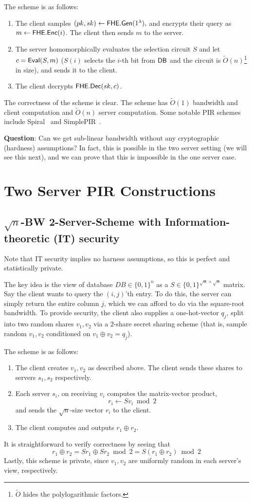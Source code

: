 The scheme is as follows:
\begin{enumerate}
	\item The client samples $(pk,sk) \leftarrow {\sf FHE}.{\sf Gen}(1^\lambda),$ and encrypts their query as $m \leftarrow {\sf FHE}.{\sf Enc}(i)$. The client then sends $m$ to the server.
	\item The server homomorphically evaluates the selection circuit $S$ and let ${c} = {\sf Eval}(S, m)$ ($S(i)$ selects the $i$-th bit from ${\sf DB}$ and the circuit is $\tilde{O}(n)$\footnote{$\tilde{O}$ hides the polylogarithmic factors.} in size), and sends it to the client. 
	\item The client decrypts ${\sf FHE}.{\sf Dec}(sk,c)$.
\end{enumerate}
The correctness of the scheme is clear. The scheme  has $\tilde{O}(1)$ bandwidth and client computation and $\tilde{O}(n)$ server computation. Some notable PIR schemes include Spiral~\cite{spiral} and SimplePIR~\cite{simplepir}.

\textbf{Question}: Can we get sub-linear bandwidth without any cryptographic (hardness) assumptions? In fact, this is possible in the two server setting (we will see this next), and we can prove that this is impossible in the one server case.

\section{Two Server PIR Constructions}
\subsection{$\sqrt{n}$-BW 2-Server-Scheme with Information-theoretic (IT) security}
Note that IT security implies no harness assumptions, so this is perfect and statistically private.

The key idea is the view of database $DB \in \{0,1\}^n$ as a $S \in \{0,1\}^{\sqrt{n} \times \sqrt{n}}$ matrix. Say the client wants to query the $(i,j)$'th entry. To do this, the server can simply return the entire column $j$, which we can afford to do via the square-root bandwidth. To provide security, the client also supplies a one-hot-vector $q_j$, split into two random shares $v_{1},v_{2}$ via a 2-share secret sharing scheme (that is, sample random $v_1,v_2$ conditioned on $v_1 \oplus v_2 = q_{j}$).

The scheme is as follows:
\begin{enumerate}
	\item The client creates $v_{1},v_{2}$ as described above. The client sends these shares to servers $s_{1},s_{2}$ respectively.
	\item Each server $s_{i}$, on receiving $v_{i}$ computes the matrix-vector product,
	\[r_{i} \leftarrow S v_{i} \bmod 2\]
	and sends the $\sqrt{n}$-size vector $r_{i}$ to the client.
	\item The client computes and outputs $r_{1} \oplus r_{2}$.
\end{enumerate}
It is straightforward to verify correctness by seeing that
\[r_{1} \oplus r_{2} = S r_{1} \oplus Sr_{2} \bmod 2 = S (r_{1} \oplus r_{2}) \bmod 2\]
Lastly, this scheme is private, since $v_{1},v_{2}$ are uniformly random in each server's view, respectively.

